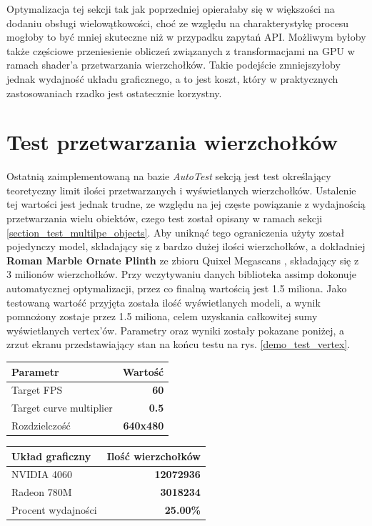Optymalizacja tej sekcji tak jak poprzedniej opierałaby się w większości na dodaniu obsługi wielowątkowości, choć ze względu na charakterystykę procesu mogłoby to być mniej skuteczne niż w przypadku zapytań API. Możliwym byłoby także częściowe przeniesienie obliczeń związanych z transformacjami na GPU w ramach shader'a przetwarzania wierzchołków. Takie podejście zmniejszyłoby jednak wydajność układu graficznego, a to jest koszt, który w praktycznych zastosowaniach rzadko jest ostatecznie korzystny. 

\section{Test przetwarzania wierzchołków}
Ostatnią zaimplementowaną na bazie \textit{AutoTest} sekcją jest test określający teoretyczny limit ilości przetwarzanych i wyświetlanych wierzchołków. Ustalenie tej wartości jest jednak trudne, ze względu na jej częste powiązanie z wydajnością przetwarzania wielu obiektów, czego test został opisany w ramach sekcji \ref{section_test_multilpe_objects}. Aby uniknąć tego ograniczenia użyty został pojedynczy model, składający się z bardzo dużej ilości wierzchołków, a dokładniej \textbf{Roman Marble Ornate Plinth} ze zbioru Quixel Megascans \cite{fab:QuixelMegascans:RomanMarbleOrnatePlinth}, składający się z 3 milionów wierzchołków. Przy wczytywaniu danych biblioteka assimp dokonuje automatycznej optymalizacji, przez co finalną wartością jest 1.5 miliona. Jako testowaną wartość przyjęta została ilość wyświetlanych modeli, a wynik pomnożony zostaje przez 1.5 miliona, celem uzyskania całkowitej sumy wyświetlanych vertex'ów. Parametry oraz wyniki zostały pokazane poniżej, a zrzut ekranu przedstawiający stan na końcu testu na rys. \ref{demo_test_vertex}.

\begin{center}
	\begin{tabular}{ |l r|}
		\hline
		\textbf{Parametr} & \textbf{Wartość} \\
		\hline
		Target FPS & \textbf{60} \\
		Target curve multiplier & \textbf{0.5} \\
		Rozdzielczość & \textbf{640x480} \\
		\hline
	\end{tabular}
	\quad
	\begin{tabular}{ |l r|}
		\hline
		\textbf{Układ graficzny} & \textbf{Ilość wierzchołków} \\
		\hline
		NVIDIA 4060 & \textbf{12072936} \\
		Radeon 780M & \textbf{3018234} \\
		\hline
		Procent wydajności & \textbf{25.00\%} \\
		\hline
	\end{tabular}
\end{center}

